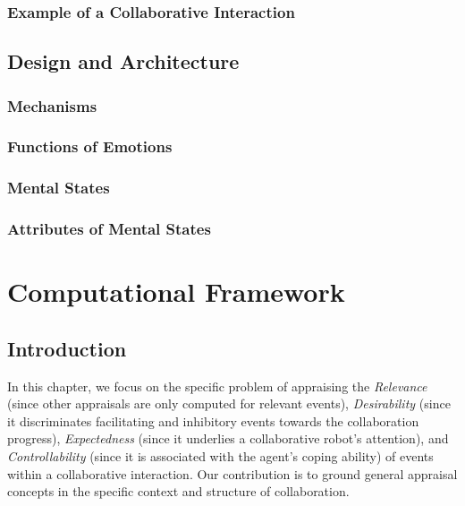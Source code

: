 \documentclass[12pt]{report}
\begin{document}
\subsection{Example of a Collaborative Interaction}

\section{Design and Architecture}

\subsection{Mechanisms}

\subsection{Functions of Emotions}

\subsection{Mental States}
\label{sec:mental-states}

\subsection{Attributes of Mental States}

\chapter{Computational Framework}
\label{ch:appraisals}

\vspace*{-2mm}
\section{Introduction}
\vspace*{-3mm}
In this chapter, we focus on the specific problem of appraising the
\textit{Relevance} (since other appraisals are only computed for relevant
events), \textit{Desirability} (since it discriminates facilitating and
inhibitory events towards the collaboration progress), \textit{Expectedness}
(since it underlies a collaborative robot's attention), and
\textit{Controllability} (since it is associated with the agent's coping
ability) of events within a collaborative interaction. Our contribution is to
ground general appraisal concepts in the specific context and structure of
collaboration.
\end{document}
